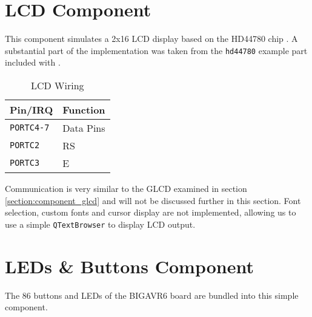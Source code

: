\section{\acs{LCD} Component} \label{section:component_lcd}

This component simulates a 2x16 \ac{LCD} display based on the HD44780
chip \cite{hitachi01, samsung02, winstar02}. A substantial part of the implementation
was taken from the \verb|hd44780| example part included with \simavr.

\begin{table}[ht]
\centering
\begin{tabular}{ll}
\toprule

Pin/\ac{IRQ}        & Function \\

\midrule

\lstinline|PORTC4-7|& Data Pins\\
\lstinline|PORTC2|  & \acf{RS}\\
\lstinline|PORTC3|  & \acf{E}\\

\bottomrule
\end{tabular}
\caption{\ac{LCD} Wiring}
\label{tab:wiring_lcd}
\end{table}

Communication is very similar to the \ac{GLCD} examined in section
\ref{section:component_glcd} and will not be discussed further in this section.
Font selection, custom fonts and cursor display are not implemented, allowing us to use
a simple \lstinline|QTextBrowser| to display \ac{LCD} output.

\section{\acsp{LED} \& Buttons Component}

The 86 buttons and \acp{LED} of the BIGAVR6 board are bundled into this simple
component.

